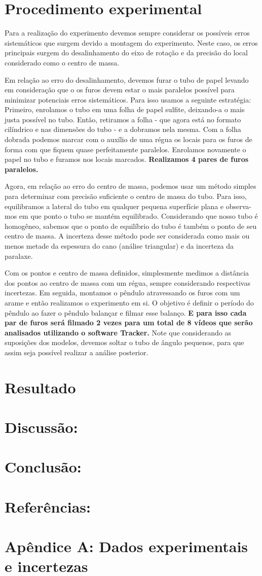 \documentclass[a4paper]{report}
\begin{document}
\section*{Procedimento experimental}

\qquad Para a realização do experimento devemos sempre considerar os possíveis erros sistemáticos que surgem devido a montagem do experimento. Neste caso, os erros principais surgem do desalinhamento do eixo de rotação e da precisão do local considerado como o centro de massa.

\qquad Em relação ao erro do desalinhamento, devemos furar o tubo de papel levando em consideração que o os furos devem estar o mais paralelos possível para minimizar potenciais erros sistemáticos. Para isso usamos a seguinte estratégia: Primeiro, enrolamos o tubo em uma folha de papel sulfite, deixando-a o mais justa possível no tubo. Então, retiramos a folha - que agora está no formato cilíndrico e nas dimensões do tubo - e a dobramos nela mesma. Com a folha dobrada podemos marcar com o auxílio de uma régua os locais para os furos de forma com que fiquem quase perfeitamente paralelos. Enrolamos novamente o papel no tubo e furamos nos locais marcados.\textbf{ Realizamos 4 pares de furos paralelos.}

\qquad Agora, em relação ao erro do centro de massa, podemos usar um método simples para determinar com precisão suficiente o centro de massa do tubo. Para isso, equilibramos a lateral do tubo em qualquer pequena superfície plana e observa-mos em que ponto o tubo se mantém equilibrado. Considerando que nosso tubo é homogêneo, sabemos que o ponto de equilíbrio do tubo é também o ponto de seu centro de massa. A incerteza desse método pode ser considerada como mais ou menos metade da espessura do cano (análise triangular) e da incerteza da paralaxe.

\qquad Com os pontos e centro de massa definidos, simplesmente medimos a distância dos pontos ao centro de massa com um régua, sempre considerando respectivas incertezas. Em seguida, montamos o pêndulo atravessando os furos com um arame e então realizamos o experimento em si. O objetivo é definir o período do pêndulo ao fazer o pêndulo balançar e filmar esse balanço.\textbf{ E para isso cada par de furos será filmado 2 vezes para um total de 8 vídeos que serão analisados utilizando o software Tracker.} Note que considerando as suposições dos modelos, devemos soltar o tubo de ângulo pequenos, para que assim seja possível realizar a análise posterior.
\section*{Resultado}
\section*{Discussão:}
\section*{Conclusão:}
\section*{Referências:}
\section*{Apêndice A: Dados experimentais e incertezas}
\end{document}
